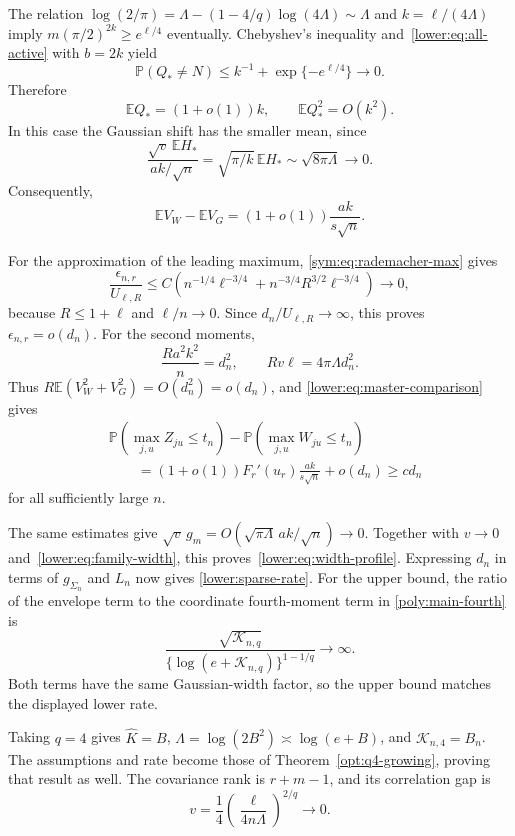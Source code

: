 \documentclass[11pt,letterpaper]{article}
\newenvironment{vSixBlock}{\color{magenta}}{}
\theoremstyle{remark}
\newcommand{\E}{\mathbb E}
\newcommand{\Pp}{\mathbb P}
\begin{document}
\begin{vSixBlock}
The relation
\(\log(2/\pi)=\Lambda-(1-4/q)\log(4\Lambda)\sim\Lambda\)
and \(k=\ell/(4\Lambda)\) imply
\(m(\pi/2)^{2k}\ge e^{\ell/4}\) eventually. Chebyshev's
inequality and~\eqref{lower:eq:all-active} with \(b=2k\) yield
\[
 \Pp(Q_*\ne N)\le k^{-1}+\exp\{-e^{\ell/4}\}\to0.
\]
Therefore
\begin{equation}
 \E Q_*=(1+o(1))k,\qquad \E Q_*^2=O(k^2).
 \label{q4:eq:sparse-max-moments}
\end{equation}
In this case the Gaussian shift has the smaller mean, since
\[
 \frac{\sqrt v\,\E H_*}{ak/\sqrt n}
 =\sqrt{\pi/k}\,\E H_*\sim\sqrt{8\pi\Lambda}\to0.
\]
Consequently,
\begin{equation}
 \E V_W-\E V_G=(1+o(1))\frac{ak}{s\sqrt n}.
 \label{q4:eq:sparse-mean-gap}
\end{equation}

For the approximation of the leading maximum,
\eqref{sym:eq:rademacher-max} gives
\[
 \frac{\epsilon_{n,r}}{U_{\ell,R}}
 \le C\left(n^{-1/4}\ell^{-3/4}
       +n^{-3/4}R^{3/2}\ell^{-3/4}\right)\to0,
\]
because \(R\le1+\ell\) and \(\ell/n\to0\). Since
\(d_n/U_{\ell,R}\to\infty\), this proves
\(\epsilon_{n,r}=o(d_n)\). For the second moments,
\[
 \frac{Ra^2k^2}{n}=d_n^2,\qquad
 Rv\ell=4\pi\Lambda d_n^2.
\]
Thus \(R\E(V_W^2+V_G^2)=O(d_n^2)=o(d_n)\), and
\eqref{lower:eq:master-comparison} gives
\begin{equation}
\begin{split}
 &\Pp(\max_{j,u}Z_{ju}\le t_n)-\Pp(\max_{j,u}W_{ju}\le t_n)\\
 &\qquad=(1+o(1))F_r'(u_r)\frac{ak}{s\sqrt n}
           +o(d_n)\ge c d_n
\end{split}
 \label{q4:eq:sparse-orthant}
\end{equation}
for all sufficiently large \(n\).

The same estimates give
\(\sqrt v\,g_m=O(\sqrt{\pi\Lambda}\,ak/\sqrt n)\to0\).
Together with \(v\to0\) and~\eqref{lower:eq:family-width},
this proves~\eqref{lower:eq:width-profile}. Expressing \(d_n\)
in terms of \(g_{\Sigma_n}\) and \(L_n\) now gives
\eqref{lower:sparse-rate}. For the upper bound, the ratio of the
envelope term to the coordinate fourth-moment term in
\eqref{poly:main-fourth} is
\[
 \frac{\sqrt{\mathcal K_{n,q}}}
 {\{\log(e+\mathcal K_{n,q})\}^{1-1/q}}\to\infty.
\]
Both terms have the same Gaussian-width factor, so the upper bound
matches the displayed lower rate.

Taking \(q=4\) gives \(\widehat K=B\),
\(\Lambda=\log(2B^2)\asymp\log(e+B)\), and
\(\mathcal K_{n,4}=B_n\). The assumptions and rate become those
of Theorem~\ref{opt:q4-growing}, proving that result as well.
The covariance rank is \(r+m-1\), and its correlation gap is
\[
 v=\frac14\left(\frac{\ell}{4n\Lambda}\right)^{2/q}\to0.
\]
\end{vSixBlock}
\end{document}
